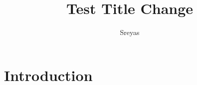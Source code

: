 \documentclass{article}
\title{Test Title Change}
\author{Sreyas}
\begin{document}
\maketitle

\section{Introduction}
\end{document}
